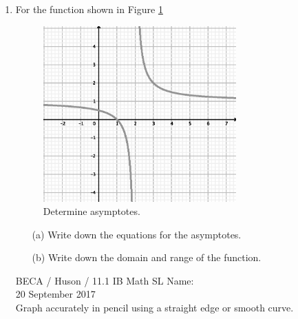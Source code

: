 \documentclass{article}
\begin{document}
\begin{enumerate}
\item For the function shown in Figure \ref{asymptote}
\begin{figure}[!hb]
    \centering
    \includegraphics[width=0.7\textwidth]{1-4_asymptotes.eps}
    \caption{Determine asymptotes. \label{asymptote}}
\end{figure}
\begin{itemize}
    \item[(a)] Write down the equations for the asymptotes.
	\item[(b)] Write down the domain and range of the function.
\end{itemize}

\newpage
\noindent BECA / Huson / 11.1 IB Math SL \qquad \qquad Name:\\
20 September 2017\\
Graph accurately in pencil using a straight edge or smooth curve.


\end{enumerate}
\end{document}
